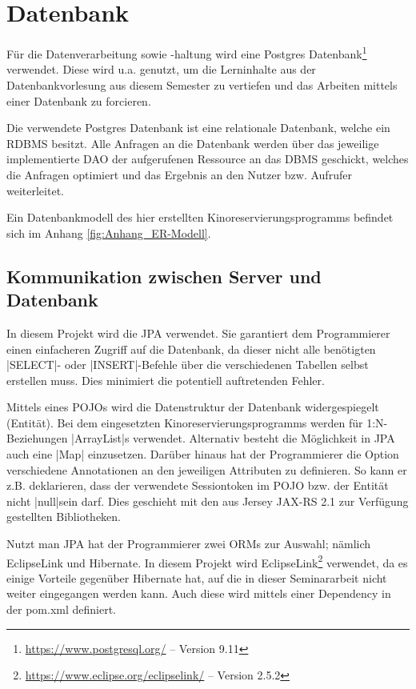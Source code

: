 \section{Datenbank}
\label{sec:datenbank}

Für die Datenverarbeitung sowie -haltung wird eine Postgres Datenbank\footnote{\url{https://www.postgresql.org/} -- Version 9.11} verwendet.
Diese wird u.a. genutzt, um die Lerninhalte aus der Datenbankvorlesung aus diesem Semester zu vertiefen und das Arbeiten mittels einer Datenbank zu forcieren.

Die verwendete Postgres Datenbank ist eine relationale Datenbank, welche ein \acf{RDBMS} besitzt.
Alle Anfragen an die Datenbank werden über das jeweilige implementierte \acs{DAO} der aufgerufenen Ressource an das \acs{DBMS} geschickt, welches die Anfragen optimiert und das Ergebnis an den Nutzer bzw. Aufrufer weiterleitet.

Ein Datenbankmodell des hier erstellten Kinoreservierungsprogramms befindet sich im Anhang \vref{fig:Anhang_ER-Modell}.

\subsection{Kommunikation zwischen Server und Datenbank}
\label{ssec:jpa}

In diesem Projekt wird die \ac{JPA} verwendet.
Sie garantiert dem Programmierer einen einfacheren Zugriff auf die Datenbank, da dieser nicht alle benötigten \sinline |SELECT|- oder \sinline |INSERT|-Befehle über die verschiedenen Tabellen selbst erstellen muss.
Dies minimiert die potentiell auftretenden Fehler.

Mittels eines \acp{POJO} wird die Datenstruktur der Datenbank widergespiegelt (Entität).
Bei dem eingesetzten Kinoreservierungsprogramms werden für 1:N-Beziehungen \jinline|ArrayList|s verwendet.
Alternativ besteht die Möglichkeit in \ac{JPA} auch eine \jinline|Map| einzusetzen.
Darüber hinaus hat der Programmierer die Option verschiedene Annotationen an den jeweiligen Attributen zu definieren.
So kann er z.B. deklarieren, dass der verwendete Sessiontoken im \ac{POJO} bzw. der Entität nicht \jinline|null|sein darf.
Dies geschieht mit den aus Jersey JAX-RS 2.1 zur Verfügung gestellten Bibliotheken.

Nutzt man \ac{JPA} hat der Programmierer zwei \acp{ORM} zur Auswahl; nämlich EclipseLink und Hibernate.
In diesem Projekt wird EclipseLink\footnote{\url{https://www.eclipse.org/eclipselink/} -- Version 2.5.2} verwendet, da es einige Vorteile gegenüber Hibernate hat, auf die in dieser Seminararbeit nicht weiter eingegangen werden kann.
Auch diese wird mittels einer Dependency in der pom.xml definiert.

